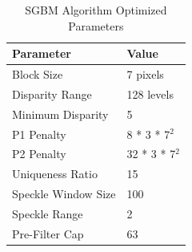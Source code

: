 \documentclass[conference]{IEEEtran}
\begin{document}


\begin{table}[htbp]
\caption{SGBM Algorithm Optimized Parameters}
\centering %

\renewcommand{\arraystretch}{1.5}

\begin{tabularx}{\columnwidth}{ Y Y }
\toprule
\textbf{Parameter} & \textbf{Value}  \\
\midrule
Block Size & 7 pixels  \\
Disparity Range & 128 levels \\
Minimum Disparity & 5  \\
P1 Penalty & 8 * 3 * 7$^2$  \\
P2 Penalty & 32 * 3 * 7$^2$  \\
Uniqueness Ratio & 15  \\
Speckle Window Size & 100  \\
Speckle Range & 2  \\
Pre-Filter Cap & 63 \\
\bottomrule
\end{tabularx}
\label{tab2}
\end{table}
\end{document}
